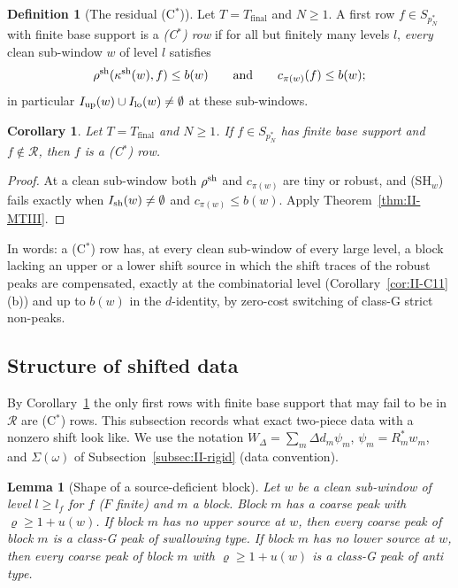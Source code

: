 \documentclass[10pt]{amsart}
\newtheorem{lemma}[theorem]{Lemma}
\newtheorem{corollary}[theorem]{Corollary}
\theoremstyle{definition}
\newtheorem{definition}[theorem]{Definition}
\theoremstyle{remark}
\newcommand{\Rec}{\mathcal R}
\begin{document}
\begin{definition}[The residual (C$^*$)]\label{def:II-Cstar}
Let $T=T_{\mathrm{final}}$ and $N\ge1$.  A first row $f\in S_{p_N^*}$ with finite base support is a \emph{(C$^*$) row}
if for all but finitely many levels $l$, \emph{every} clean sub-window $w$
of level $l$ satisfies
\[
 \rho^{\rm sh}(\kappa^{\rm sh}(w),f)\le b(w)\qquad\text{and}\qquad
 c_{\pi(w)}(f)\le b(w);
\]
in particular $I_{\rm up}(w)\cup I_{\rm lo}(w)\ne\emptyset$ at these
sub-windows.
\end{definition}

\begin{corollary}\label{cor:II-Cstarnec}
Let $T=T_{\mathrm{final}}$ and $N\ge1$.  If $f\in S_{p_N^*}$ has finite base support and $f\notin\Rec$, then $f$ is a
\textup{(C$^*$)} row.
\end{corollary}

\begin{proof}
At a clean sub-window both $\rho^{\rm sh}$ and $c_{\pi(w)}$ are tiny or robust,
and (SH$_w$) fails exactly when $I_{\rm sh}(w)\ne\emptyset$ and
$c_{\pi(w)}\le b(w)$.  Apply Theorem~\ref{thm:II-MTIII}.
\end{proof}

In words: a (C$^*$) row has, at every clean sub-window of every large
level, a block lacking an upper or a lower shift source in which the shift
traces of the robust peaks are compensated, exactly at the combinatorial
level (Corollary~\ref{cor:II-C11}(b)) and up to $b(w)$ in the $d$-identity, by
zero-cost switching of class-G strict non-peaks.

\subsection{Structure of shifted data}\label{subsec:II-structure}

By Corollary~\ref{cor:II-Cstarnec} the only first rows with finite base
support that may fail to be in $\Rec$ are (C$^*$) rows.  This subsection
records what exact two-piece data with a nonzero shift look like.  We use
the notation $W_\Delta=\sum_m\Delta d_m\psi_m$, $\psi_m=R_m^*w_m$, and
$\Sigma(\omega)$ of Subsection~\ref{subsec:II-rigid} (data convention).

\begin{lemma}[Shape of a source-deficient block]\label{lem:II-Dprime}
Let $w$ be a clean sub-window of level $l\ge l_f$ for $f$ \textup{(}$F$
finite\textup{)} and $m$ a block.  Block $m$ has a coarse peak with
$\varrho\ge1+u(w)$.  If block $m$ has no upper source at $w$, then every
coarse peak of block $m$ is a class-G peak of swallowing type.  If block $m$
has no lower source at $w$, then every coarse peak of block $m$ with
$\varrho\ge1+u(w)$ is a class-G peak of anti type.
\end{lemma}
\end{document}
